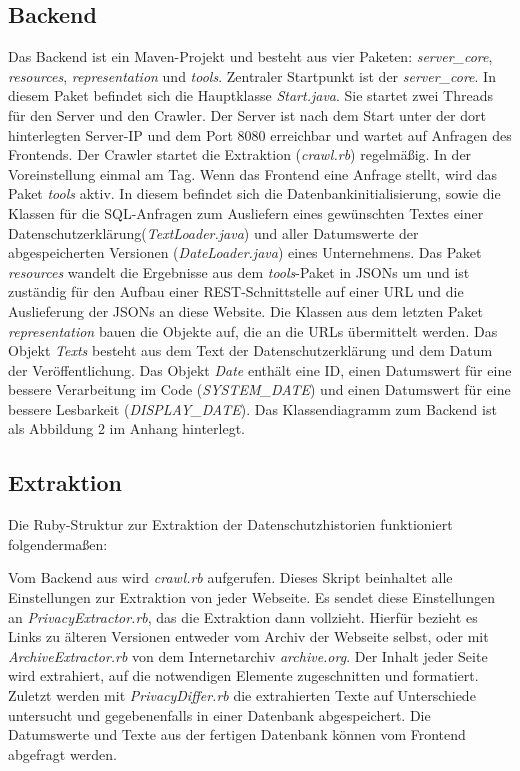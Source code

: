 \documentclass{article}
\begin{document}
	\subsection{Backend}
	Das Backend ist ein Maven-Projekt und besteht aus vier Paketen: \textit{server\_core},  \textit{resources}, \textit{representation} und \textit{tools}.\newline 
	Zentraler Startpunkt ist der \textit{server\_core}. In diesem Paket befindet sich die Hauptklasse \textit{Start.java}. Sie startet zwei Threads für den Server und den Crawler. Der Server ist nach dem Start unter der dort hinterlegten Server-IP und dem Port 8080 erreichbar und wartet auf Anfragen des Frontends. Der Crawler startet die Extraktion (\textit{crawl.rb}) regelmäßig. In der Voreinstellung einmal am Tag.\newline 
	Wenn das Frontend eine Anfrage stellt, wird das Paket \textit{tools} aktiv. In diesem befindet sich die Datenbankinitialisierung, sowie die Klassen für die SQL-Anfragen zum Ausliefern eines gewünschten Textes einer Datenschutzerklärung(\textit{TextLoader.java}) und aller Datumswerte der abgespeicherten Versionen (\textit{DateLoader.java}) eines Unternehmens.\newline 
	Das Paket \textit{resources} wandelt die Ergebnisse aus dem \textit{tools}-Paket in JSONs um und ist zuständig für den Aufbau einer REST-Schnittstelle auf einer URL und die Auslieferung der JSONs an diese Website.\newline 
	Die Klassen aus dem letzten Paket \textit{representation} bauen die Objekte auf, die an die URLs übermittelt werden. Das Objekt \textit{Texts} besteht aus dem Text der Datenschutzerklärung und dem Datum der Veröffentlichung. Das Objekt \textit{Date} enthält eine ID, einen Datumswert für eine bessere Verarbeitung im Code (\textit{SYSTEM\_DATE}) und einen Datumswert für eine bessere Lesbarkeit (\textit{DISPLAY\_DATE}).\newline
	Das Klassendiagramm zum Backend ist als Abbildung 2 im Anhang hinterlegt.
	 
	
	\subsection{Extraktion}
	Die Ruby-Struktur zur Extraktion der Datenschutzhistorien funktioniert folgendermaßen:
	
	Vom Backend aus wird \textit{crawl.rb} aufgerufen. Dieses Skript beinhaltet alle Einstellungen zur Extraktion von jeder Webseite. Es sendet diese Einstellungen an \textit{PrivacyExtractor.rb}, das die Extraktion dann vollzieht. Hierfür bezieht es Links zu älteren Versionen entweder vom Archiv der Webseite selbst, oder mit \textit{ArchiveExtractor.rb} von dem Internetarchiv \textit{archive.org}. Der Inhalt jeder Seite wird extrahiert, auf die notwendigen Elemente zugeschnitten und formatiert. Zuletzt werden mit \textit{PrivacyDiffer.rb} die extrahierten Texte auf Unterschiede untersucht und gegebenenfalls in einer Datenbank abgespeichert. Die Datumswerte und Texte aus der fertigen Datenbank können vom Frontend abgefragt werden.
	
\end{document}

